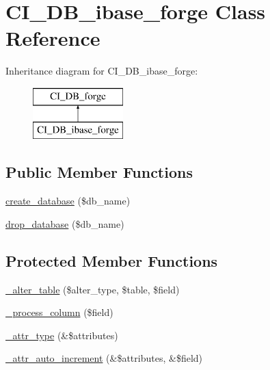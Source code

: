 \hypertarget{class_c_i___d_b__ibase__forge}{}\section{C\+I\+\_\+\+D\+B\+\_\+ibase\+\_\+forge Class Reference}
\label{class_c_i___d_b__ibase__forge}
Inheritance diagram for C\+I\+\_\+\+D\+B\+\_\+ibase\+\_\+forge\+:\begin{figure}[H]
\begin{center}
\leavevmode
\includegraphics[height=2.000000cm]{class_c_i___d_b__ibase__forge}
\end{center}
\end{figure}
\subsection*{Public Member Functions}
\begin{DoxyCompactItemize}
\item 
\mbox{\hyperlink{class_c_i___d_b__ibase__forge_a5f2de7626b88b0cb7ae9b1ff152208e5}{create\+\_\+database}} (\$db\+\_\+name)
\item 
\mbox{\hyperlink{class_c_i___d_b__ibase__forge_a200ff8890c1984750a0a4083bf501adf}{drop\+\_\+database}} (\$db\+\_\+name)
\end{DoxyCompactItemize}
\subsection*{Protected Member Functions}
\begin{DoxyCompactItemize}
\item 
\mbox{\hyperlink{class_c_i___d_b__ibase__forge_a6afc8d51475bfabf0d5b2b1c51ae0fd6}{\+\_\+alter\+\_\+table}} (\$alter\+\_\+type, \$table, \$field)
\item 
\mbox{\hyperlink{class_c_i___d_b__ibase__forge_ab1bb408da415884311bec74008790721}{\+\_\+process\+\_\+column}} (\$field)
\item 
\mbox{\hyperlink{class_c_i___d_b__ibase__forge_abf5b3c5c2da969d514da370aacf6db20}{\+\_\+attr\+\_\+type}} (\&\$attributes)
\item 
\mbox{\hyperlink{class_c_i___d_b__ibase__forge_a5597d091e18f5d25b657041587f71567}{\+\_\+attr\+\_\+auto\+\_\+increment}} (\&\$attributes, \&\$field)
\end{DoxyCompactItemize}
